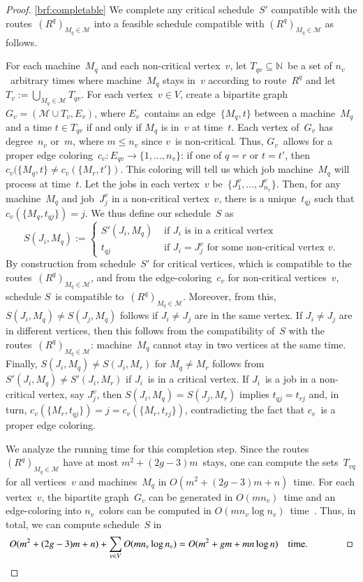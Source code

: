 \documentclass[natbib,sort,smallextended,envcountsame,envcountsect,numbook]{svjour3}
\newcommand{\Ms}{\mathcal M}
\def\totstays{\ensuremath{{m^2+(2g-3)m}}}
\begin{document}
\begin{proof}
\eqref{brf:completable}
We complete any critical schedule~\(S'\) compatible
with the routes~\((R^q)_{M_q\in\Ms}\) into a feasible schedule
compatible with \((R^q)_{M_q\in\Ms}\) as follows.

For each machine~\(M_q\)
and each non-critical vertex~\(v\),
let \(T_{qv}\subseteq\mathbb N\)~be a set of \(n_v\)~arbitrary times
where machine~\(M_q\) stays in~\(v\) according to
route~\(R^q\) and let \(T_v:=\bigcup_{M_q\in\Ms} T_{qv}\).
For each vertex~\(v\in V\), create a bipartite
graph~\(G_{v}=(\Ms\cup T_v,E_{v})\),
where \(E_{v}\)~contains an edge~\(\{M_q,t\}\) between a machine~\(M_q\) and a time \(t\in T_{qv}\)
if and only if \(M_q\) is in~\(v\) at time~\(t\).
Each vertex of~\(G_v\) has degree~\(n_v\) or~\(m\), where \(m\leq n_v\)
since \(v\)~is non-critical.
Thus, \(G_v\)~allows for a proper edge coloring~\(c_v\colon E_{qv}\to \{1,\dots,n_v\}\):
if one of \(q=r\) or \(t=t'\), then \(c_v(\{M_q,t\}\ne c_v(\{M_r,t'\})\).
This coloring will tell us which job machine~\(M_q\) will process at time~\(t\).
Let the jobs in each vertex~\(v\)
be~\(\{J_1^v,\dots,J_{n_v}^v\}\).
Then, for any machine~\(M_q\) and job~\(J_j^v\)
in a non-critical vertex~\(v\),
there is a unique~\(t_{qj}\) such that \(c_v(\{M_q,t_{qj}\})=j\).
We thus define our schedule~\(S\) as
\[
  S(J_i,M_q):=
  \begin{cases}
    S'(J_i,M_q)&\text{ if $J_i$ is in a critical vertex}\\
    t_{qj}&\text{ if $J_i=J_j^v$ for some non-critical vertex~\(v\)}.
  \end{cases}
\]
By construction from schedule~\(S'\) for critical vertices,
which is compatible to the routes~\((R^q)_{M_q\in\Ms}\),
and
from the edge-coloring~\(c_v\) for non-critical vertices~\(v\),
schedule \(S\)~is compatible to~\((R^q)_{M_q\in\Ms}\).
Moreover, from this, \(S(J_i,M_q)\ne S(J_j,M_q)\)
follows if \(J_i\ne J_j\) are in the same vertex.
If \(J_i\ne J_j\) are in different vertices,
then this follows from the compatibility of~\(S\)
with the routes~\((R^q)_{M_q\in\Ms}\): machine~\(M_q\)
cannot stay in two vertices at the same time.
Finally, \(S(J_i,M_q)\ne S(J_i,M_r)\) for \(M_q\ne M_r\)
follows from \(S'(J_i,M_q)\ne S'(J_i,M_r)\) if \(J_i\)~is in a critical vertex.
If \(J_i\)~is a job in a non-critical vertex, say \(J_j^v\),
then \(S(J_i,M_q)=S(J_j,M_r)\) implies \(t_{qj}=t_{rj}\) and,
in turn, \(c_v(\{M_r,t_{qj}\})=j=c_v(\{M_r,t_{rj}\})\),
contradicting the fact that \(c_v\)~is a proper edge coloring.

We analyze the running time for this completion step.
Since the routes~\((R^q)_{M_q\in\Ms}\) have at most
\(\totstays\)~stays, one can compute the sets~\(T_{vq}\)
for all vertices~\(v\) and machines~\(M_q\) in
\(O(\totstays+n)\)~time.
For each vertex~\(v\),
the bipartite graph~\(G_{v}\) can be generated
in \(O(mn_v)\)~time and an edge-coloring into \(n_v\)~colors
can be computed in \(O(mn_v\log n_v)\)~time~\citep{COS01}.
Thus, in total,
we can compute schedule~\(S\) in
\begin{align*}
  O(\totstays+n)+\sum_{v\in V}O(mn_v\log n_v)=O(m^2+gm+mn\log n)\text{\quad time.}\qquad\qed
\end{align*}
\end{proof}
\end{document}
